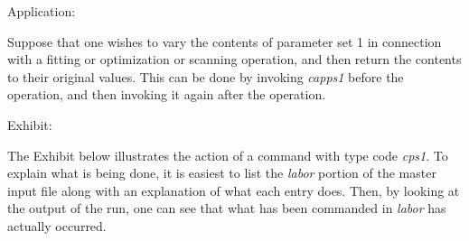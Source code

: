 \vspace{5mm}
     Application:
\vspace{2mm}

Suppose that one wishes to vary the contents of parameter set 1 in connection with a fitting or optimization or scanning operation, and then return the contents to their original values.  This can be done by invoking {\em capps1} before the operation, and then invoking it again after the operation.

\vspace{5mm}
     Exhibit:
\vspace{2mm}

The Exhibit below illustrates the action of a command with type code {\em cps1}.  To explain what is being done, it is easiest to list the {\em labor} portion of the master input file along with an explanation of what each entry does.  Then, by looking at the output of the \Mary run, one can see that what has been commanded in {\em labor} has actually occurred.

